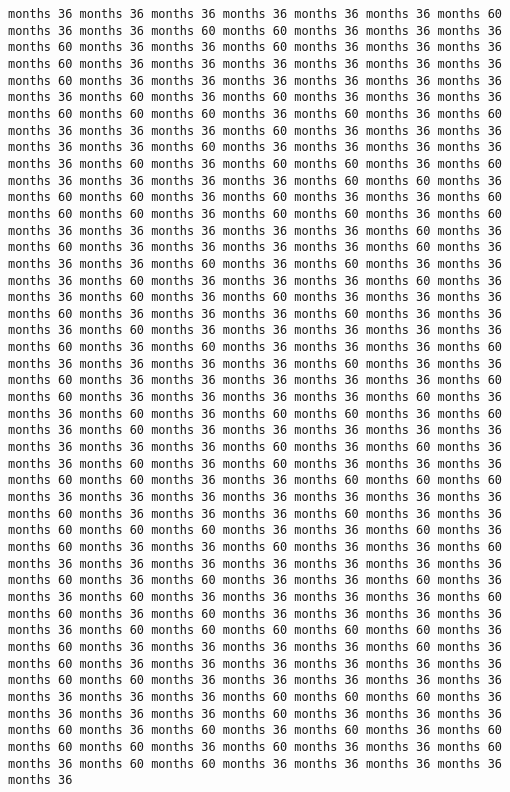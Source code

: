 \documentclass[11pt]{article}
\begin{document}
\begin{Verbatim}[commandchars=\\\{\}, frame=single, framerule=2mm, rulecolor=\color{outerrorbackground}]
months 36 months 36 months 36 months 36 months 36 months 36 months 60 months 36 months 36 months 60 months 60 months 36 months 36 months 36 months 60 months 36 months 36 months 60 months 36 months 36 months 36 months 60 months 36 months 36 months 36 months 36 months 36 months 36 months 60 months 36 months 36 months 36 months 36 months 36 months 36 months 36 months 60 months 36 months 60 months 36 months 36 months 36 months 60 months 60 months 60 months 36 months 60 months 36 months 60 months 36 months 36 months 36 months 60 months 36 months 36 months 36 months 36 months 36 months 60 months 36 months 36 months 36 months 36 months 36 months 60 months 36 months 60 months 60 months 36 months 60 months 36 months 36 months 36 months 36 months 60 months 60 months 36 months 60 months 60 months 36 months 60 months 36 months 36 months 60 months 60 months 60 months 36 months 60 months 60 months 36 months 60 months 36 months 36 months 36 months 36 months 36 months 60 months 36 months 60 months 36 months 36 months 36 months 36 months 60 months 36 months 36 months 36 months 60 months 36 months 60 months 36 months 36 months 36 months 60 months 36 months 36 months 36 months 60 months 36 months 36 months 60 months 36 months 60 months 36 months 36 months 36 months 60 months 36 months 36 months 36 months 60 months 36 months 36 months 36 months 60 months 36 months 36 months 36 months 36 months 36 months 60 months 36 months 60 months 36 months 36 months 36 months 60 months 36 months 36 months 36 months 36 months 60 months 36 months 36 months 60 months 36 months 36 months 36 months 36 months 36 months 60 months 60 months 36 months 36 months 36 months 36 months 60 months 36 months 36 months 60 months 36 months 60 months 60 months 36 months 60 months 36 months 60 months 36 months 36 months 36 months 36 months 36 months 36 months 36 months 36 months 60 months 36 months 60 months 36 months 36 months 60 months 36 months 60 months 36 months 36 months 36 months 60 months 60 months 36 months 36 months 60 months 60 months 60 months 36 months 36 months 36 months 36 months 36 months 36 months 36 months 60 months 36 months 36 months 36 months 60 months 36 months 36 months 60 months 60 months 60 months 36 months 36 months 60 months 36 months 60 months 36 months 36 months 60 months 36 months 36 months 60 months 36 months 36 months 36 months 36 months 36 months 36 months 36 months 60 months 36 months 60 months 36 months 36 months 60 months 36 months 36 months 60 months 36 months 36 months 36 months 36 months 60 months 60 months 36 months 60 months 36 months 36 months 36 months 36 months 36 months 60 months 60 months 60 months 60 months 60 months 36 months 60 months 36 months 36 months 36 months 36 months 60 months 36 months 60 months 36 months 36 months 36 months 36 months 36 months 36 months 60 months 60 months 36 months 36 months 36 months 36 months 36 months 36 months 36 months 36 months 60 months 60 months 60 months 36 months 36 months 36 months 36 months 60 months 36 months 36 months 36 months 60 months 36 months 60 months 36 months 60 months 36 months 60 months 60 months 60 months 36 months 60 months 36 months 36 months 60 months 36 months 60 months 60 months 36 months 36 months 36 months 36 months 36 
\end{Verbatim}
\end{document}
